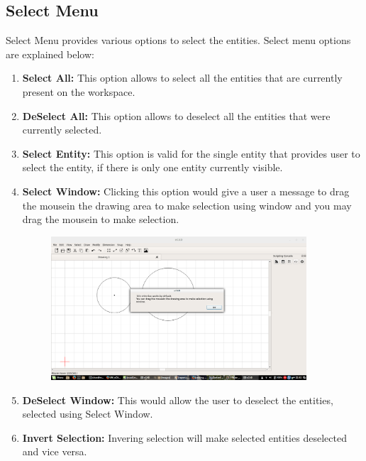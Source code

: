 \subsection{Select Menu}
Select Menu provides various options to select the entities. Select menu options are explained below:
\begin{enumerate}
\item \textbf{Select All:} This option allows to select all the entities that are currently present on the workspace.
\item \textbf{DeSelect All:} This option allows to deselect all the entities that were currently selected.
\item \textbf{Select Entity:} This option is valid for the single entity that provides user to select the entity, if there is only one entity currently visible.
\item \textbf{Select Window:} Clicking this option would give a user a message to drag the mousein the drawing area to make selection using window and you may drag the mousein to make selection.
\begin{figure}[h!]
\centering
\includegraphics[width=0.9\textwidth]{images/messsage.png}
\end{figure}
\item \textbf{DeSelect Window:} This would allow the user to deselect the entities, selected using Select Window.
\item \textbf{Invert Selection:} Invering selection will make selected entities deselected and vice versa.
\end{enumerate}